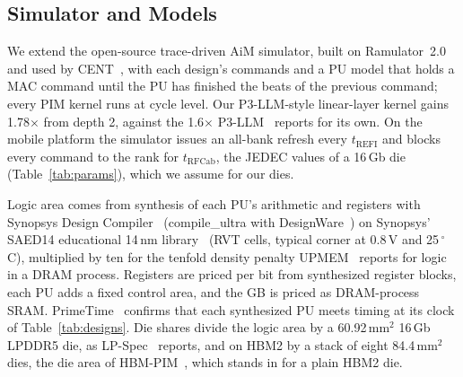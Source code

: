 \subsection{Simulator and Models}
\label{sec:method:models}
We extend the open-source trace-driven AiM simulator, built on Ramulator~2.0~\cite{ramulator2} and used by
CENT~\cite{cent}, with each design's commands and a PU model that holds a MAC command until the PU has finished the
beats of the previous command; every PIM kernel runs at cycle level. Our P3-LLM-style linear-layer kernel gains 1.78$\times$ from
depth 2, against the 1.6$\times$ P3-LLM~\cite{p3llm} reports for its own. On the mobile platform the simulator issues an all-bank refresh every $t_\mathrm{REFI}$ and blocks every command to
the rank for $t_\mathrm{RFCab}$, the JEDEC values of a 16\,Gb die (Table~\ref{tab:params}), which we assume for our
dies\ASSUMPTION.

Logic area comes from synthesis of each PU's arithmetic and registers with Synopsys Design Compiler~\cite{synopsysdc} (compile\_ultra
with DesignWare~\cite{synopsysdw}) on Synopsys' SAED14 educational 14\,nm library~\cite{saed14} (RVT cells, typical corner at 0.8\,V and 25\,$^\circ$C),
multiplied by ten for the tenfold density penalty UPMEM~\cite{devaux} reports for logic in a DRAM
process\ASSUMPTION. Registers are priced per bit from synthesized register blocks, each PU adds a fixed control area,
and the GB is priced as DRAM-process SRAM\ASSUMPTION. PrimeTime~\cite{synopsyspt} confirms that each synthesized PU meets timing at its
clock of Table~\ref{tab:designs}. Die shares divide the logic area by a 60.92\,mm$^2$ 16\,Gb LPDDR5 die, as
LP-Spec~\cite{lpspec} reports, and on HBM2 by a stack of eight 84.4\,mm$^2$ dies, the die area of
HBM-PIM~\cite{hbmpim}, which stands in for a plain HBM2 die\ASSUMPTION.

\begin{table}[t]
  \caption{PIM designs: parameters, logic area (mm$^2$) and peak power (mW;
  without clock gates in parentheses).}
  \label{tab:designs}
  \centering
  \footnotesize
  \setlength{\tabcolsep}{2.2pt}
  
\end{table}

